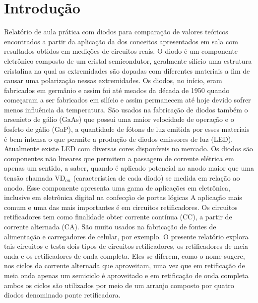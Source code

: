 \section{Introdução} 
Relatório de aula prática com diodos para comparação de valores teóricos encontrados a partir da aplicação da dos conceitos apresentados em sala com resultados obtidos em medições de circuitos reais.
O diodo é um componente eletrônico composto de um cristal semicondutor, geralmente silício uma estrutura cristalina na qual as extremidades são dopadas com diferentes materiais a fim de causar uma polarização nessas extremidades.
Os diodos, no início, eram fabricados em germânio e assim foi até meados da década de 1950 quando começaram a ser fabricados em silício e assim permanecem até hoje devido sofrer menos influência da temperatura. São usados na fabricação de diodos também  o arsenieto de gálio (GaAs) que possui uma maior velocidade de operação e o fosfeto de gálio (GaP), a quantidade de fótons de luz emitida por esses materiais é bem intensa o que permite a produção de diodos emissores de luz (LED). Atualmente existe LED com diversas cores disponíveis no mercado.
Os diodos são componentes não lineares que permitem a passagem de corrente elétrica em apenas um sentido, a saber, quando é aplicado potencial no anodo maior que uma tensão chamada VD$_{on}$ (característica de cada diodo) se medida em relação ao anodo. Esse componente apresenta uma gama de aplicações em eletrônica, inclusive em eletrônica digital na confecção de portas lógicas A aplicação mais comum e uma das mais importantes é em circuitos retificadores. Os circuitos retificadores tem como finalidade obter corrente contínua (CC), a partir de corrente alternada (CA). São muito usados na fabricação de fontes de alimentação e carregadores de celular, por exemplo. O presente relatório explora tais circuitos e testa dois tipos de circuitos retificadores, os retificadores de meia onda e os retificadores de onda completa.  Eles se diferem, como o nome sugere, nos ciclos da corrente alternada que aproveitam, uma vez que em retificação de meia onda apenas um semiciclo é aproveitado e em retificação de onda completa ambos os ciclos são utilizados por meio de um arranjo composto por quatro diodos denominado ponte retificadora.




